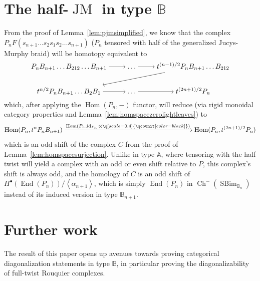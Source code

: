 \documentclass[11pt]{article}
\DeclareMathOperator{\Hom}{Hom}
\DeclareMathOperator{\End}{End}
\DeclareMathOperator{\id}{id}
\DeclareMathOperator{\Ch}{Ch}
\DeclareMathOperator{\SBim}{SBim}
\DeclareMathOperator{\JM}{JM}
\theoremstyle{definition}
\theoremstyle{remark}
\numberwithin{equation}{section}
\begin{document}
\section{The half-$\JM$ in type $\mathbb{B}$}
From the proof of Lemma~\ref{lem:pjmsimplified}, we know that the complex
$P_nF(s_{n+1}\dots s_{2}s_1s_2\dots s_{n+1})$
($P_n$ tensored with half of the generalized Jucys-Murphy braid) will
be homotopy equivalent to
\[\begin{tikzcd}[ampersand replacement=\&,cramped]
	{P_nB_{n+1}\dots B_{212}\dots B_{n+1}} \& \dots \& {t^{(n-1)/2}P_nB_{n+1}\dots B_{212}} \\
	{t^{n/2}P_nB_{n+1}\dots B_{2}B_1} \& \dots \& {t^{(2n+1)/2}P_n}
	\arrow[from=1-1, to=1-2]
	\arrow[from=1-2, to=1-3]
	\arrow[from=1-3, to=2-1]
	\arrow[from=2-1, to=2-2]
	\arrow[from=2-2, to=2-3]
\end{tikzcd}\]
which, after applying the $\Hom(P_n,-)$ functor, will reduce
(via rigid monoidal category properties and Lemma~\ref{lem:homspacezerolightleaves})
to
\[
 \Hom(P_n,t^{n}P_nB_{n+1})
	     \xrightarrow{\Hom(P_n,\id_{P_n} \otimes
	     \q[scale=0.4]{\qcounit[color=black]})}
     \Hom(P_n,t^{(2n+1)/2}P_n)
\]
which is an odd shift of the complex $C$ from the proof of
Lemma~\ref{lem:homspacesurjection}. Unlike in type $\mathbb{A}$,
where tensoring with the
half twist will yield a complex with an odd or even shift relative to $P$,
this complex's shift is always odd, and the homology of $C$ is an odd shift of
$H^\bullet(\End(P_n))/\left<\alpha_{n+1}\right>$, which is simply $\End(P_n)$ in
$\Ch^-(\SBim_{\mathbb{B}_{n}})$ instead of its induced version in
type $\mathbb{B}_{n+1}$.
\section{Further work}
The result of this paper opens up avenues
towards proving categorical diagonalization
statements in type $\mathbb{B}$, in particular proving the diagonalizability of
full-twist Rouquier complexes.


\end{document}
